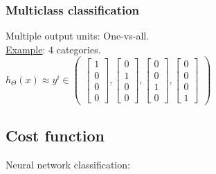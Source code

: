 \subsubsection{Multiclass classification}
Multiple output units: One-vs-all.\\
\underline{Example}: 4 categories.\\
$h_\Theta(x) \approx y^{i} \in \begin{pmatrix}
\begin{bmatrix} 1\\ 0\\ 0\\ 0\end{bmatrix}, \begin{bmatrix} 0\\ 1\\ 0\\ 0\end{bmatrix}, \begin{bmatrix} 0\\ 0\\ 1\\ 0\end{bmatrix}, \begin{bmatrix} 0\\ 0\\ 0\\ 1\end{bmatrix}
\end{pmatrix}$

%
\subsection{Cost function}
Neural network classification:

